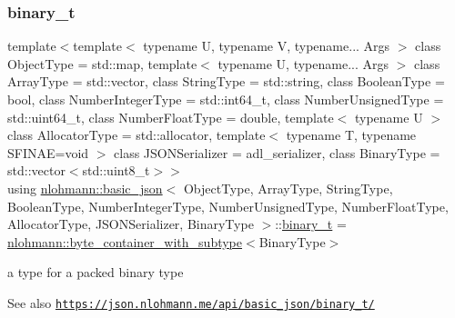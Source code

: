 \subsubsection{\texorpdfstring{binary\+\_\+t}{binary\_t}}
{\footnotesize\ttfamily template$<$template$<$ typename U, typename V, typename... Args $>$ class Object\+Type = std\+::map, template$<$ typename U, typename... Args $>$ class Array\+Type = std\+::vector, class String\+Type  = std\+::string, class Boolean\+Type  = bool, class Number\+Integer\+Type  = std\+::int64\+\_\+t, class Number\+Unsigned\+Type  = std\+::uint64\+\_\+t, class Number\+Float\+Type  = double, template$<$ typename U $>$ class Allocator\+Type = std\+::allocator, template$<$ typename T, typename S\+F\+I\+N\+A\+E=void $>$ class J\+S\+O\+N\+Serializer = adl\+\_\+serializer, class Binary\+Type  = std\+::vector$<$std\+::uint8\+\_\+t$>$$>$ \\
using \hyperlink{classnlohmann_1_1basic__json}{nlohmann\+::basic\+\_\+json}$<$ Object\+Type, Array\+Type, String\+Type, Boolean\+Type, Number\+Integer\+Type, Number\+Unsigned\+Type, Number\+Float\+Type, Allocator\+Type, J\+S\+O\+N\+Serializer, Binary\+Type $>$\+::\hyperlink{classnlohmann_1_1basic__json_ad6c955145bebde84d93991ffed7cd389}{binary\+\_\+t} =  \hyperlink{classnlohmann_1_1byte__container__with__subtype}{nlohmann\+::byte\+\_\+container\+\_\+with\+\_\+subtype}$<$Binary\+Type$>$}



a type for a packed binary type 

\begin{DoxySeeAlso}{See also}
\href{https://json.nlohmann.me/api/basic_json/binary_t/}{\tt https\+://json.\+nlohmann.\+me/api/basic\+\_\+json/binary\+\_\+t/} 
\end{DoxySeeAlso}
\mbox{\label{classnlohmann_1_1basic__json_a44fd1a12c9c54623c942b430e7a72937}} 
